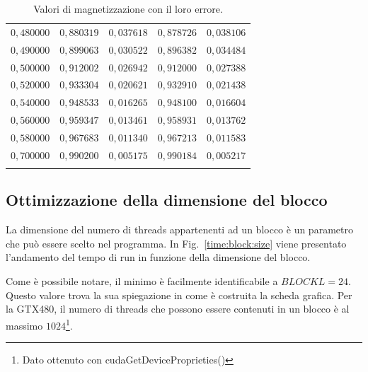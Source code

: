 \documentclass[a4paper,12pt]{article}
\begin{document}
\begin{table}
\begin{center}
\begin {tabular}{c|c|c|c|c}
$0,480000$ &       $0,880319$   &     $0,037618$  &  $0,878726$  &  $0,038106$\\
$0,490000$ &       $0,899063$   &     $0,030522$  &  $0,896382$  &  $0,034484$\\
$0,500000$ &       $0,912002$   &     $0,026942$  &  $0,912000$  &  $0,027388$\\
$0,520000$ &       $0,933304$   &     $0,020621$  &  $0,932910$  &  $0,021438$\\
$0,540000$ &       $0,948533$   &     $0,016265$  &  $0,948100$  &  $0,016604$\\
$0,560000$ &       $0,959347$   &     $0,013461$  &  $0,958931$  &  $0,013762$\\
$0,580000$ &       $0,967683$   &     $0,011340$  &  $0,967213$  &  $0,011583$\\
$0,700000$ &       $0,990200$   &     $0,005175$  &  $0,990184$  &  $0,005217$\\
\\
\hline
\hline
\end{tabular}
\end{center}
\caption{\label{tab:mag}
	Valori di magnetizzazione con il loro errore.
}
\end{table}

\subsection{Ottimizzazione della dimensione del blocco}
La dimensione del numero di threads appartenenti ad un blocco \`e un parametro che pu\`o essere scelto nel programma. In Fig.~\ref{time:block:size} viene presentato l'andamento del tempo di run in funzione della dimensione del blocco.

Come \`e possibile notare, il minimo \`e facilmente identificabile a $BLOCKL=24$. Questo valore trova la sua spiegazione in come \`e costruita la scheda grafica. Per la GTX480, il numero di threads che possono essere contenuti in un blocco \`e al massimo $1024$\footnote{Dato ottenuto con cudaGetDeviceProprieties()}.
\end{document}
